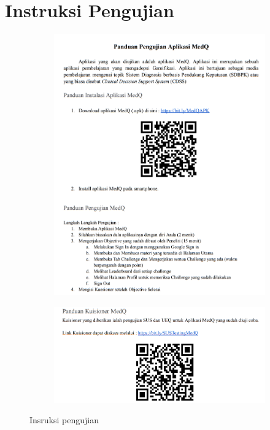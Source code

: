 \section{Instruksi Pengujian}
\begin{figure}[H]
	\centering
	\begin{subfigure}[b]{0.8\textwidth}
		\centering
	  \includegraphics[width=\linewidth]{contents/appendix/Prosedur1.png}
	  \label{fig:instruksi}
	\end{subfigure}
	\begin{subfigure}[b]{0.75\textwidth}
		\centering
	  \includegraphics[width=\linewidth]{contents/appendix/Prosedur2.png}
	  \label{fig:Instruksi2}
	\end{subfigure}
	\caption{Insruksi pengujian}
	\label{Fig:Lampiraaannnn}
\end{figure}
\newpage
